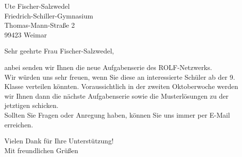 \documentclass[DIN, pagenumber=false, parskip=half,%
               fromalign=right, 
               fromrule=false]{scrlttr2}
\begin{document}
 
\begin{letter}{Ute Fischer-Salzwedel\\Friedrich-Schiller-Gymnasium\\Thomas-Mann-Straße 2\\99423 Weimar
}



\opening{Sehr geehrte Frau Fischer-Salzwedel,}

anbei senden wir Ihnen die neue Aufgabenserie des ROLF-Netzwerks.\\
Wir würden uns sehr freuen, wenn Sie diese an interessierte Schüler ab der 9. Klasse verteilen könnten. Voraussichtlich in der zweiten Oktoberwoche werden wir Ihnen dann die nächste Aufgabenserie sowie die Musterlösungen zu der jetztigen schicken. \\
Sollten Sie Fragen oder Anregung haben, können Sie uns immer per E-Mail erreichen.

\closing{Vielen Dank für Ihre Unterstützung!\\Mit freundlichen Grüßen\vspace{1cm}}




\end{letter}
 
\end{document}
